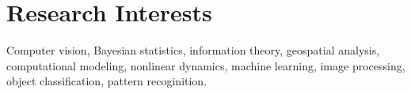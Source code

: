 \section{\sc Research Interests} %
Computer vision, Bayesian statistics, information theory, geospatial analysis, computational modeling, nonlinear dynamics, machine learning, image processing, object classification, pattern recoginition.
\vspace{1mm}

